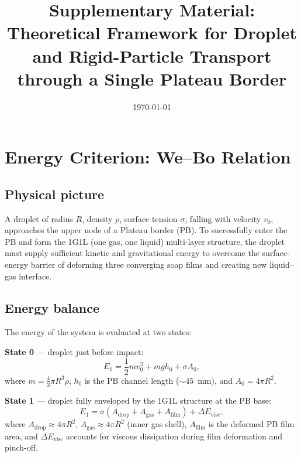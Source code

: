 \documentclass[%
 preprint,
 superscriptaddress,
 amsmath,amssymb,
 aps, prl,
]{revtex4-2}
\begin{document}
\title{Supplementary Material:\\
Theoretical Framework for Droplet and Rigid-Particle Transport\\
through a Single Plateau Border}

\date{\today}

\maketitle

\section{Energy Criterion: We--Bo Relation}

\subsection{Physical picture}

A droplet of radius $R$, density $\rho$, surface tension $\sigma$, falling with velocity $v_0$, approaches the upper node of a Plateau border (PB).
To successfully enter the PB and form the 1G1L (one gas, one liquid) multi-layer structure,
the droplet must supply sufficient kinetic and gravitational energy to overcome the surface-energy barrier
of deforming three converging soap films and creating new liquid--gas interface.

\subsection{Energy balance}

The energy of the system is evaluated at two states:

\textbf{State 0} --- droplet just before impact:
\begin{equation}
E_0 = \frac{1}{2} m v_0^2 + m g h_0 + \sigma A_0,
\end{equation}
where $m = \frac{4}{3}\pi R^3\rho$, $h_0$ is the PB channel length ($\sim 45$~mm),
and $A_0 = 4\pi R^2$.

\textbf{State 1} --- droplet fully enveloped by the 1G1L structure at the PB base:
\begin{equation}
E_1 = \sigma (A_\text{drop} + A_\text{gas} + A_\text{film}) + \Delta E_\text{visc},
\end{equation}
where $A_\text{drop} \approx 4\pi R^2$, $A_\text{gas} \approx 4\pi R^2$ (inner gas shell),
$A_\text{film}$ is the deformed PB film area, and $\Delta E_\text{visc}$ accounts for viscous dissipation
during film deformation and pinch-off.
\end{document}
